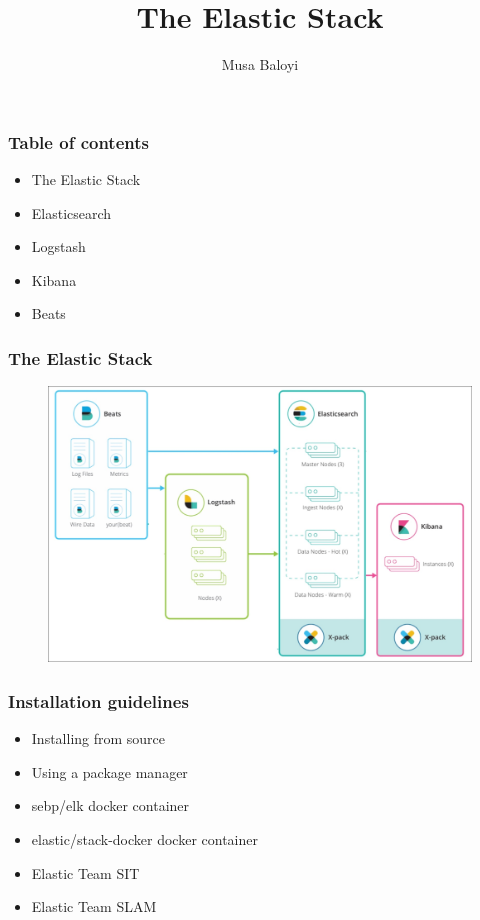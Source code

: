 \documentclass[11pt]{beamer}
\begin{document}
	\author{Musa Baloyi}
	\title{The Elastic Stack}
	\begin{frame}[plain]
	\maketitle
\end{frame}

\begin{frame}
\frametitle{Table of contents}
\begin{itemize}
	\item The Elastic Stack
	\item Elasticsearch
	\item Logstash
	\item Kibana
	\item Beats
\end{itemize}
\end{frame}


\begin{frame}
\frametitle{The Elastic Stack}
\begin{figure}[h]
	\centering
	\includegraphics[scale=.5]{images/elastic_stack}
\end{figure}
\end{frame}

\begin{frame}
\frametitle{Installation guidelines}
\begin{itemize}
	\item Installing from source
	\item Using a package manager
	\item sebp/elk docker container
	\item elastic/stack-docker docker container
	\item Elastic Team SIT
	\item Elastic Team SLAM
\end{itemize}
\end{frame}
\end{document}
